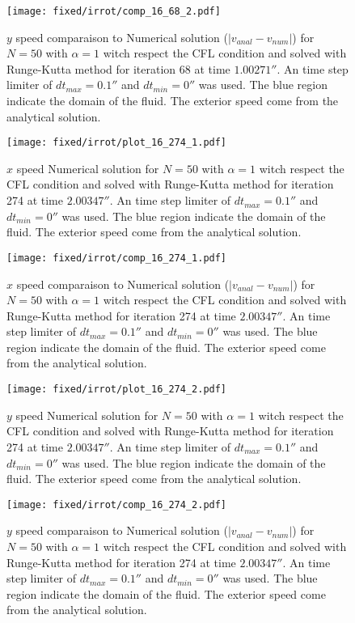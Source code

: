 \begin{figure}
\texttt{[image: fixed/irrot/comp\_16\_68\_2.pdf]}
\caption{$y$ speed comparaison to Numerical solution ($|v_{anal}-v_{num}|$)  for $N=50$ with $\alpha=1$ witch respect the CFL condition and solved with Runge-Kutta method
for iteration 68 at time $\unit{1.00271}{\second}$.
An time step limiter of $dt_{max}=\unit{0.1}{\second}$ and $dt_{min}=\unit{0}{\second}$ was used.
The blue region indicate the domain of the fluid. The exterior speed come from the analytical solution.
\label{fix:comp_16_68_2}
}
\end{figure}

\begin{figure}
\texttt{[image: fixed/irrot/plot\_16\_274\_1.pdf]}
\caption{$x$ speed Numerical solution for $N=50$ with $\alpha=1$ witch respect the CFL condition and solved with Runge-Kutta method
for iteration 274 at time $\unit{2.00347}{\second}$.
An time step limiter of $dt_{max}=\unit{0.1}{\second}$ and $dt_{min}=\unit{0}{\second}$ was used.
The blue region indicate the domain of the fluid. The exterior speed come from the analytical solution.
\label{fix:plot_16_274_1}
}
\end{figure}

\begin{figure}
\texttt{[image: fixed/irrot/comp\_16\_274\_1.pdf]}
\caption{$x$ speed comparaison to Numerical solution  ($|v_{anal}-v_{num}|$) for $N=50$ with $\alpha=1$ witch respect the CFL condition and solved with Runge-Kutta method
for iteration 274 at time $\unit{2.00347}{\second}$.
An time step limiter of $dt_{max}=\unit{0.1}{\second}$ and $dt_{min}=\unit{0}{\second}$ was used.
The blue region indicate the domain of the fluid. The exterior speed come from the analytical solution.
\label{fix:comp_16_274_1}
}
\end{figure}

\begin{figure}
\texttt{[image: fixed/irrot/plot\_16\_274\_2.pdf]}
\caption{$y$ speed Numerical solution for $N=50$ with $\alpha=1$ witch respect the CFL condition and solved with Runge-Kutta method
for iteration 274 at time $\unit{2.00347}{\second}$.
An time step limiter of $dt_{max}=\unit{0.1}{\second}$ and $dt_{min}=\unit{0}{\second}$ was used.
The blue region indicate the domain of the fluid. The exterior speed come from the analytical solution.
\label{fix:plot_16_274_2}
}
\end{figure}

\begin{figure}
\texttt{[image: fixed/irrot/comp\_16\_274\_2.pdf]}
\caption{$y$ speed comparaison to Numerical solution ($|v_{anal}-v_{num}|$) for $N=50$ with $\alpha=1$ witch respect the CFL condition and solved with Runge-Kutta method
for iteration 274 at time $\unit{2.00347}{\second}$.
An time step limiter of $dt_{max}=\unit{0.1}{\second}$ and $dt_{min}=\unit{0}{\second}$ was used.
The blue region indicate the domain of the fluid. The exterior speed come from the analytical solution.
\label{fix:comp_16_274_2}
}
\end{figure}


